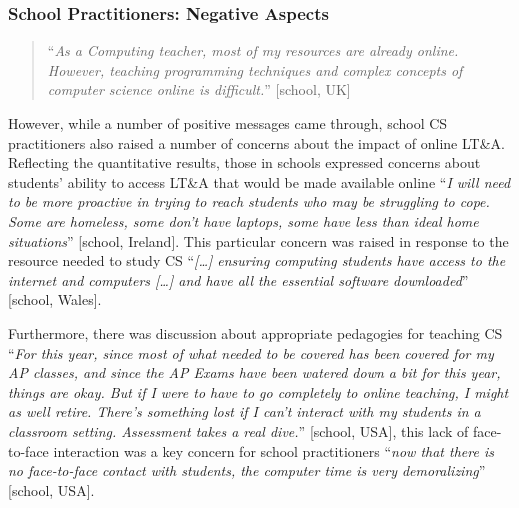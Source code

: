 \documentclass[conference]{IEEEtran}
\begin{document}


\subsubsection{School Practitioners: Negative Aspects}

\begin{quotation}
``{\emph{As a Computing teacher, most of my resources are already
online. However, teaching programming techniques and complex concepts
of computer science online is difficult.}}''  [school, UK]
\end{quotation}

However, while a number of positive messages came through, school
CS practitioners also raised a number of concerns about
the impact of online LT\&A. Reflecting the quantitative results, those
in schools expressed concerns about students’ ability to access LT\&A that
would be made available online ``{\emph{I will need to be more
proactive in trying to reach students who may be struggling to
cope. Some are homeless, some don't have laptops, some have less than
ideal home situations}}'' [school, Ireland]. This particular concern was
raised in response to the resource needed to study CS
``{\emph{[…] ensuring computing students have access to the internet
and computers […] and have all the essential software downloaded}}''
[school, Wales].

Furthermore, there was discussion about appropriate pedagogies for
teaching CS ``{\emph{For this year, since most of what
needed to be covered has been covered for my AP classes, and since the
AP Exams have been watered down a bit for this year, things are
okay. But if I were to have to go completely to online teaching, I
might as well retire. There's something lost if I can't interact with
my students in a classroom setting. Assessment takes a real dive.}}''
[school, USA], this lack of face-to-face interaction was a key concern for
school practitioners ``{\emph{now that there is no face-to-face
contact with students, the computer time is very demoralizing}}''
[school, USA].
\end{document}
